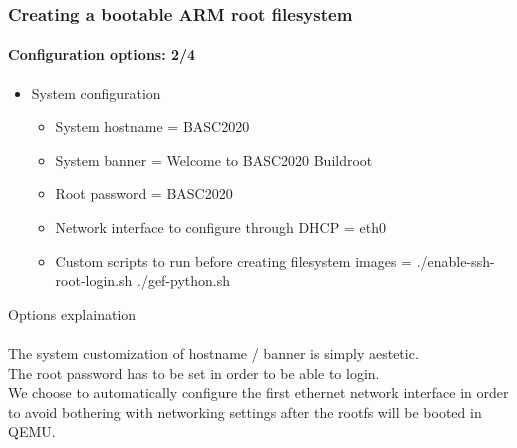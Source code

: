 {  \begin{frame}
    \frametitle{Creating a bootable ARM root filesystem}
    \framesubtitle{Configuration options: 2/4}
    \begin{itemize}
      \toolchainOptionsList
      \item System configuration
      \begin{itemize}
        \item System hostname = BASC2020
        \item System banner = Welcome to BASC2020 Buildroot
        \item Root password = BASC2020
        \item Network interface to configure through DHCP = eth0
        \item Custom scripts to run before creating filesystem images = ./enable-ssh-root-login.sh ./gef-python.sh
      \end{itemize}
    \end{itemize}
  \end{frame}
   {
    Options explaination \\
    \toolchainOptionsDescription \\
    The system customization of hostname / banner is simply aestetic. \\
    The root password has to be set in order to be able to login. \\
    We choose to automatically configure the first ethernet network interface in order to avoid bothering with networking settings after the rootfs will be booted in QEMU. \\
    \sshRootLoginDescription \\
    \gefPythonDescription
  }

}
